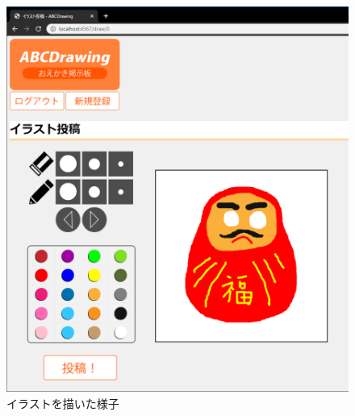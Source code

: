 \documentclass[a4j,titlepage]{jsarticle}
\begin{document}
\begin{figure}[H]
  \centering
  \includegraphics[width=14cm]{drawdaruma.png}
  \caption{イラストを描いた様子}
  \label{drawdaruma}
\end{figure}
\end{document}

